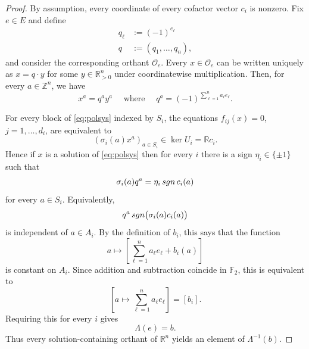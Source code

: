 \documentclass[10pt,a4paper]{amsart}
\def\RR{\mathbb{R}}
\def\ZZ{\mathbb{Z}}
\newcommand{\sgn}{\mathop{\rm sgn}\nolimits}
\begin{document}
\begin{proof}
  By assumption, every coordinate of every cofactor vector $c_i$ is
  nonzero. Fix $e\in E$ and define
  \begin{align*}
    q_\ell&:=(-1)^{e_\ell}\\
    q&:=(q_1,\ldots,q_n),
  \end{align*}
  and consider the corresponding orthant $\mathcal O_e$. Every
  $x\in\mathcal O_e$ can be written uniquely as $x = q\cdot y$ for some
  $y\in\RR_{>0}^n$ under coordinatewise multiplication. Then, for every
  $a\in \ZZ^n$, we have
  \[x^a = q^ay^a\quad \text{ where }\quad q^a=(-1)^{\sum_{\ell=1}^n a_\ell e_\ell}.\]

  For every block of \eqref{eq:polsys} indexed by $S_i$, the equations
  $f_{ij}(x)=0$, $j=1,\ldots,d_i$, are equivalent to
  $$
  \left(\sigma_i(a)x^a\right)_{a\in S_i}\in\ker U_i=\RR c_i.
  $$
  Hence if $x$ is a solution of \eqref{eq:polsys} then for every $i$
  there is a sign $\eta_i\in\{\pm1\}$ such that
  $$
  \sigma_i(a)q^a
  =
  \eta_i\sgn c_i(a)
  $$
  for every $a\in S_i$. Equivalently,
  $$
  q^a\sgn\bigl(\sigma_i(a)c_i(a)\bigr)
  $$
  is independent of $a\in A_i$.
  By the definition of $b_i$, this says that the function
  $$
  a\longmapsto \left[\sum_{\ell=1}^n a_\ell e_\ell+b_i(a)\right]
  $$
  is constant on $A_i$. Since addition and subtraction coincide in
  $\mathbb F_2$, this is equivalent to
  $$
  \left[
    a\longmapsto\sum_{\ell=1}^n a_\ell e_\ell
  \right]
  =
  [b_i].
  $$
  Requiring this for every $i$ gives
  $$
  \Lambda(e)=b.
  $$
  Thus every solution-containing orthant of $\RR^n$ yields an
  element of $\Lambda^{-1}(b)$.


\end{proof}
\end{document}
